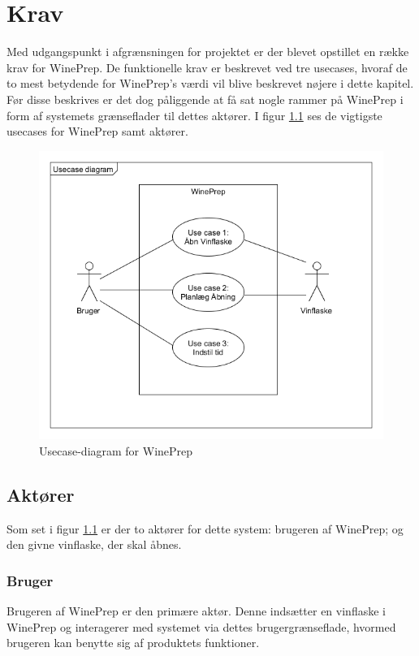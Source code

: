 \chapter{Krav}
\label{chp:Krav}
Med udgangspunkt i afgrænsningen for projektet er der blevet opstillet en række krav for WinePrep. De funktionelle krav er beskrevet ved tre usecases, 
hvoraf de to mest betydende for WinePrep's værdi vil blive beskrevet nøjere i dette kapitel. Før disse beskrives er det dog påliggende at få sat nogle rammer på WinePrep i form af systemets 
grænseflader til dettes aktører. I figur \ref{fig:UCD_WP} ses de vigtigste usecases for WinePrep samt aktører.

\begin{figure}[H]
	\centerline{\includegraphics[scale=0.5]{Usecasediagram}}
	\caption{Usecase-diagram for WinePrep}
	\label{fig:UCD_WP}
\end{figure}

\section{Aktører}
Som set i figur \ref{fig:UCD_WP} er der to aktører for dette system: brugeren af WinePrep; og den givne vinflaske, der skal åbnes.

\subsection{Bruger}
Brugeren af WinePrep er den primære aktør. Denne indsætter en vinflaske i WinePrep og interagerer med systemet via dettes brugergrænseflade, 
hvormed brugeren kan benytte sig af produktets funktioner.

